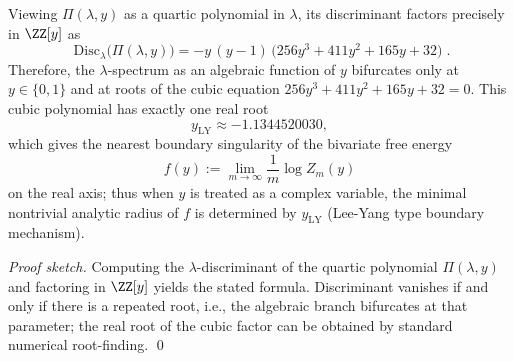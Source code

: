 \begin{conclusion}\label{con:xi-terminal-zm-discriminant-leyang}
Viewing \(\Pi(\lambda,y)\) as a quartic polynomial in \(\lambda\), its discriminant factors precisely in \(\ZZ[y]\) as
\[
\boxed{\;
\mathrm{Disc}_{\lambda}\bigl(\Pi(\lambda,y)\bigr)
=-y\,(y-1)\,\bigl(256y^3+411y^2+165y+32\bigr)\; }.
\]
Therefore, the \(\lambda\)-spectrum as an algebraic function of \(y\) bifurcates only at
\(
y\in\{0,1\}
\)
and at roots of the cubic equation
\(
256y^3+411y^2+165y+32=0
\).
This cubic polynomial has exactly one real root
\[
y_{\mathrm{LY}}\approx-1.1344520030,
\]
which gives the nearest boundary singularity of the bivariate free energy
\[
f(y):=\lim_{m\to\infty}\frac{1}{m}\log Z_m(y)
\]
on the real axis; thus when \(y\) is treated as a complex variable, the minimal nontrivial analytic radius of \(f\) is determined by \(y_{\mathrm{LY}}\) (Lee-Yang type boundary mechanism).
\end{conclusion}
\begin{proof}[Proof sketch]
Computing the \(\lambda\)-discriminant of the quartic polynomial \(\Pi(\lambda,y)\) and factoring in \(\ZZ[y]\) yields the stated formula.
Discriminant vanishes if and only if there is a repeated root, i.e., the algebraic branch bifurcates at that parameter; the real root of the cubic factor can be obtained by standard numerical root-finding. \qed
\end{proof}

